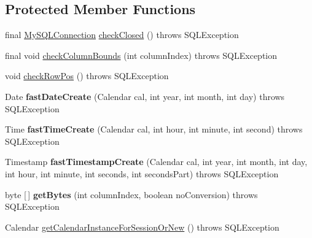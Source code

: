 \subsection*{Protected Member Functions}
\begin{DoxyCompactItemize}
\item 
final \mbox{\hyperlink{interfacecom_1_1mysql_1_1jdbc_1_1_my_s_q_l_connection}{My\+S\+Q\+L\+Connection}} \mbox{\hyperlink{classcom_1_1mysql_1_1jdbc_1_1_result_set_impl_a451fa419a4cdd5a02efd996428fcd0c4}{check\+Closed}} ()  throws S\+Q\+L\+Exception 
\item 
final void \mbox{\hyperlink{classcom_1_1mysql_1_1jdbc_1_1_result_set_impl_a1ef4220e1860ea8f9ab89180466c2bde}{check\+Column\+Bounds}} (int column\+Index)  throws S\+Q\+L\+Exception 
\item 
void \mbox{\hyperlink{classcom_1_1mysql_1_1jdbc_1_1_result_set_impl_a317dc47f2dc4149cd98ae2f1c5201821}{check\+Row\+Pos}} ()  throws S\+Q\+L\+Exception 
\item 
\mbox{\label{classcom_1_1mysql_1_1jdbc_1_1_result_set_impl_ad9ac0f88e8901124fb34473304b1bb26}} 
Date {\bfseries fast\+Date\+Create} (Calendar cal, int year, int month, int day)  throws S\+Q\+L\+Exception 
\item 
\mbox{\label{classcom_1_1mysql_1_1jdbc_1_1_result_set_impl_a129b88b10fd10dc2d421433c41f14bc9}} 
Time {\bfseries fast\+Time\+Create} (Calendar cal, int hour, int minute, int second)  throws S\+Q\+L\+Exception 
\item 
\mbox{\label{classcom_1_1mysql_1_1jdbc_1_1_result_set_impl_a9be51697ee062e6de1623bbf200de1e6}} 
Timestamp {\bfseries fast\+Timestamp\+Create} (Calendar cal, int year, int month, int day, int hour, int minute, int seconds, int seconds\+Part)  throws S\+Q\+L\+Exception 
\item 
\mbox{\label{classcom_1_1mysql_1_1jdbc_1_1_result_set_impl_a7b45a3ae9bc47cfd81cea74fe3bac573}} 
byte \mbox{[}$\,$\mbox{]} {\bfseries get\+Bytes} (int column\+Index, boolean no\+Conversion)  throws S\+Q\+L\+Exception 
\item 
Calendar \mbox{\hyperlink{classcom_1_1mysql_1_1jdbc_1_1_result_set_impl_a11c9733e6a1c56774441465dbf40ed58}{get\+Calendar\+Instance\+For\+Session\+Or\+New}} ()  throws S\+Q\+L\+Exception 

\end{DoxyCompactItemize}
